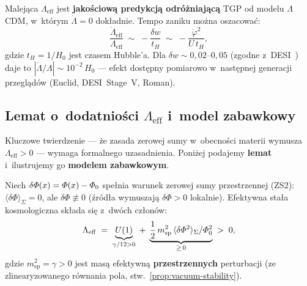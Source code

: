 \begin{remark}\label{rem:Lambda-test}
Malej\k{a}ca $\Lambda_{\mathrm{eff}}$ jest \textbf{jako\'sciow\k{a}
predykcj\k{a} odr\'o\.zniaj\k{a}c\k{a}} TGP od modelu $\Lambda$CDM,
w~kt\'orym $\dot{\Lambda} = 0$ dok\l{}adnie.
Tempo zaniku mo\.zna oszacowa\'c:
\begin{equation}\label{eq:Lambda-rate}
    \frac{\dot{\Lambda}_{\mathrm{eff}}}{\Lambda_{\mathrm{eff}}}
    \;\sim\; -\frac{\delta w}{t_H}
    \;\sim\; -\frac{\dot{\varphi}^2}{U\,t_H},
\end{equation}
gdzie $t_H = 1/H_0$ jest czasem Hubble'a. Dla $\delta w
\sim 0{,}02$--$0{,}05$ (zgodne z~DESI~\cite{DESI2024}) daje to
$|\dot{\Lambda}/\Lambda| \sim 10^{-2}\,H_0$ --- efekt
dost\k{e}pny pomiarowo w~nast\k{e}pnej generacji przegl\k{a}d\'ow
(Euclid, DESI~Stage~V, Roman).
\end{remark}

\subsection{Lemat o~dodatniości $\Lambda_{\mathrm{eff}}$
  i~model zabawkowy}\label{ssec:de-lemat}

Kluczowe twierdzenie --- \.ze zasada zerowej sumy
w~obecno\'sci materii wymusza $\Lambda_{\mathrm{eff}} > 0$ ---
wymaga formalnego uzasadnienia. Poni\.zej podajemy
\textbf{lemat} i~ilustrujemy go \textbf{modelem zabawkowym}.

\begin{lemma}\label{lem:Lambda-positive}
Niech $\delta\varPhi(x) = \varPhi(x) - \varPhi_0$ spe\l{}nia warunek zerowej sumy
przestrzennej (ZS2): $\langle\delta\Phi\rangle_\Sigma = 0$,
ale $\delta\Phi \not\equiv 0$ (\'zr\'od\l{}a wymuszaj\k{a}
$\delta\Phi > 0$ lokalnie).
Efektywna sta\l{}a kosmologiczna sk\l{}ada si\k{e} z~dw\'och
cz\l{}on\'ow:
\begin{equation}\label{eq:Lambda-pos-lem}
  \Lambda_{\mathrm{eff}}
  \;=\; \underbrace{U(1)}_{\gamma/12 > 0}
  \;+\; \underbrace{\frac{1}{2}\,m_{\mathrm{sp}}^2\,
  \langle\delta\varPhi^2\rangle_\Sigma /\varPhi_0^2}_{\geq\, 0}
  \;>\; 0,
\end{equation}
gdzie $m_{\mathrm{sp}}^2 = \gamma > 0$ jest mas\k{a} efektywn\k{a}
\textbf{przestrzennych} perturbacji (ze zlinearyzowanego
r\'ownania pola, stw.~\ref{prop:vacuum-stability}).
\end{lemma}

